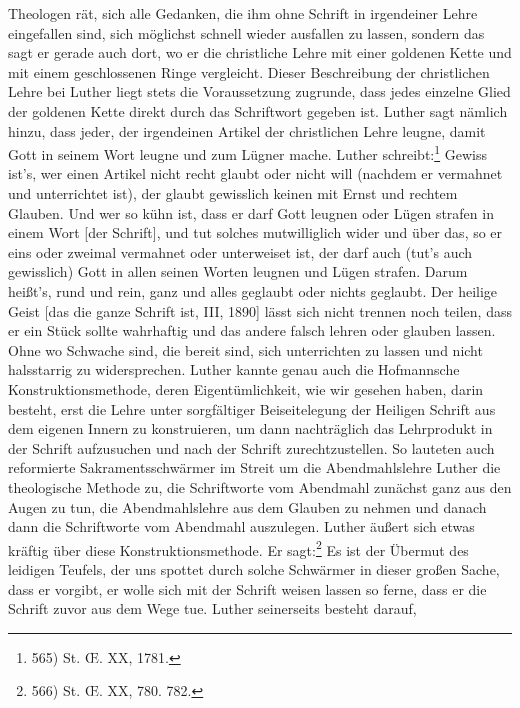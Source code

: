 Theologen rät, sich alle Gedanken, die ihm \glqq ohne Schrift\grqq{} in irgendeiner Lehre eingefallen sind, sich möglichst schnell wieder ausfallen zu lassen, sondern das sagt er gerade auch dort, wo er die christliche Lehre mit einer \glqq goldenen Kette\grqq{} und mit einem \glqq geschlossenen Ringe\grqq{} vergleicht. Dieser Beschreibung der christlichen Lehre bei Luther liegt stets die Voraussetzung zugrunde, dass jedes einzelne Glied der \glqq goldenen Kette\grqq{} direkt durch das Schriftwort gegeben ist. Luther sagt nämlich hinzu, dass jeder, der irgendeinen Artikel der christlichen Lehre leugne, damit Gott in seinem Wort leugne und zum Lügner mache. Luther schreibt:\footnote{565) St. \OE. XX, 1781.} \glqq Gewiss ist's, wer einen Artikel nicht recht glaubt oder nicht will (nachdem er vermahnet und unterrichtet ist), der glaubt gewisslich keinen mit Ernst und rechtem Glauben. Und wer so kühn ist, dass er darf Gott leugnen oder Lügen strafen in einem Wort [der Schrift], und tut solches mutwilliglich wider und über das, so er eins oder zweimal vermahnet oder unterweiset ist, der darf auch (tut's auch gewisslich) Gott in allen seinen Worten leugnen und Lügen strafen. Darum heißt's, rund und rein, ganz und alles geglaubt oder nichts geglaubt. Der heilige Geist [das die ganze Schrift ist, III, 1890] lässt sich nicht trennen noch teilen, dass er ein Stück sollte wahrhaftig und das andere falsch lehren oder glauben lassen. Ohne wo Schwache sind, die bereit sind, sich unterrichten zu lassen und nicht halsstarrig zu widersprechen.\grqq{} Luther kannte genau auch die Hofmannsche Konstruktionsmethode, deren Eigentümlichkeit, wie wir gesehen haben, darin besteht, erst die Lehre unter sorgfältiger Beiseitelegung der Heiligen Schrift aus dem eigenen Innern zu konstruieren, um dann nachträglich das Lehrprodukt in der Schrift aufzusuchen und nach der Schrift zurechtzustellen. So lauteten auch reformierte Sakramentsschwärmer im Streit um die Abendmahlslehre Luther die theologische Methode zu, die Schriftworte vom Abendmahl zunächst ganz aus den Augen zu tun, die Abendmahlslehre aus dem \glqq Glauben\grqq{} zu nehmen und danach dann die Schriftworte vom Abendmahl \glqq auszulegen\grqq{}. Luther äußert sich etwas kräftig über diese Konstruktionsmethode. Er sagt:\footnote{566) St. \OE. XX, 780. 782.} \glqq Es ist der Übermut des leidigen Teufels, der uns spottet durch solche Schwärmer in dieser großen Sache, dass er vorgibt, er wolle sich mit der Schrift weisen lassen so ferne, dass er die Schrift zuvor aus dem Wege tue.\grqq{} Luther seinerseits besteht darauf,